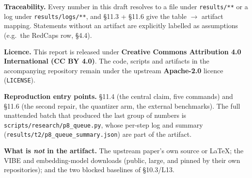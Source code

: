 \documentclass[
  10pt,
]{article}
\begin{document}
\textbf{Traceability.} Every number in this draft resolves to a file
under \texttt{results/**} or a log under \texttt{results/logs/**}, and
§11.3 + §11.6 give the table $\rightarrow$ artifact mapping. Statements without an
artifact are explicitly labelled as assumptions (e.g.~the RedCaps row,
§4.4).

\textbf{Licence.} This report is released under \textbf{Creative Commons
Attribution 4.0 International (CC BY 4.0)}. The code, scripts and
artifacts in the accompanying repository remain under the upstream
\textbf{Apache-2.0} licence (\texttt{LICENSE}).

\textbf{Reproduction entry points.} §11.4 (the central claim, five
commands) and §11.6 (the second repair, the quantizer arm, the external
benchmarks). The full unattended batch that produced the last group of
numbers is \texttt{scripts/research/p8\_queue.py}, whose per-step log
and summary (\texttt{results/t2/p8\_queue\_summary.json}) are part of
the artifact.

\textbf{What is \emph{not} in the artifact.} The upstream paper's own
source or LaTeX; the VIBE and embedding-model downloads (public, large,
and pinned by their own repositories); and the two blocked baselines of
§10.3/L13.
\end{document}
